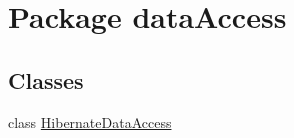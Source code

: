 \hypertarget{namespacedataAccess}{}\section{Package data\+Access}
\label{namespacedataAccess}
\subsection*{Classes}
\begin{DoxyCompactItemize}
\item 
class \mbox{\hyperlink{classdataAccess_1_1HibernateDataAccess}{Hibernate\+Data\+Access}}
\end{DoxyCompactItemize}
